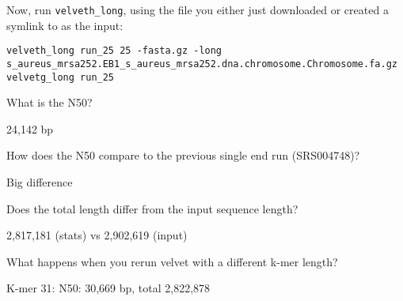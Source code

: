 \begin{steps}
Now, run \texttt{velveth\_long}, using the file you either just downloaded or created a
symlink to as the input:
\begin{lstlisting}
velveth_long run_25 25 -fasta.gz -long s_aureus_mrsa252.EB1_s_aureus_mrsa252.dna.chromosome.Chromosome.fa.gz
velvetg_long run_25
\end{lstlisting}

\end{steps}

\begin{questions}
What is the N50?
\begin{answer}
24,142 bp
\end{answer}

How does the N50 compare to the previous single end run (SRS004748)?
\begin{answer}
Big difference
\end{answer}
  
Does the total length differ from the input sequence length?
\begin{answer}
2,817,181 (stats) vs 2,902,619 (input)
\end{answer}
  
What happens when you rerun velvet with a different k-mer length?
\begin{answer}
K-mer 31: N50: 30,669 bp, total 2,822,878
\end{answer}

\end{questions}
